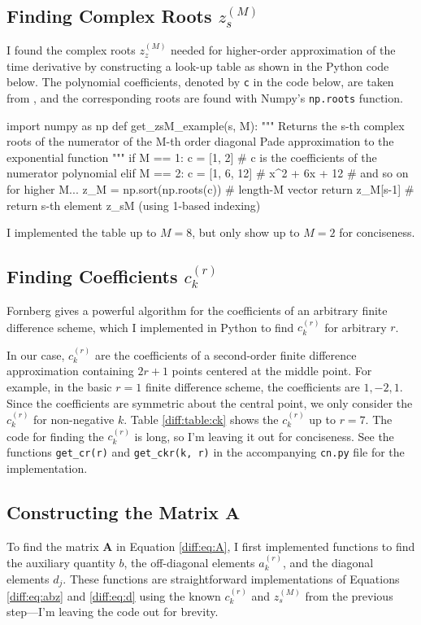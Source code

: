 \documentclass[11pt, a4paper]{article}
\newcommand{\mat}[1]{\mathbf{#1}}
\begin{document}
\subsection{Finding Complex Roots $ z_{s}^{(M)} $}
I found the complex roots $ z_{z}^{(M)} $ needed for higher-order approximation of the time derivative by constructing a look-up table as shown in the Python code below. The polynomial coefficients, denoted by \texttt{c} in the code below, are taken from \cite{oes-exp}, and the corresponding roots are found with Numpy's \texttt{np.roots} function.
\begin{python}
import numpy as np
def get_zsM_example(s, M):
    """ Returns the s-th complex roots of the numerator of the M-th order 
         diagonal Pade approximation to the exponential function """
    if M == 1:
        c = [1, 2]  # c is the coefficients of the numerator polynomial
    elif M == 2:
        c = [1, 6, 12]  # x^2 + 6x + 12
    # and so on for higher M...
    z_M = np.sort(np.roots(c))  # length-M vector
    return z_M[s-1]  # return s-th element z_sM (using 1-based indexing) 
\end{python}
I implemented the table up to $ M = 8 $, but only show up to $ M = 2 $  for conciseness.

\subsection{Finding Coefficients $ c_{k}^{(r)} $}
Fornberg \cite{fornberg} gives a powerful algorithm for the coefficients of an arbitrary finite difference scheme, which I implemented in Python to find $ c_{k}^{(r)} $ for arbitrary $ r $.

In our case, $ c_{k}^{(r)} $ are the coefficients of a second-order finite difference approximation containing $ 2r + 1 $ points centered at the middle point. For example, in the basic $ r = 1 $ finite difference scheme, the coefficients are $ 1, -2, 1 $. Since the coefficients are symmetric about the central point, we only consider the $ c_{k}^{(r)} $ for non-negative $ k $. Table \ref{diff:table:ck} shows the $ c_{k}^{(r)} $ up to $ r = 7 $. The code for finding the $ c_{k}^{(r)} $ is long, so I'm leaving it out for conciseness. See the functions \texttt{get\_cr(r)} and \texttt{get\_ckr(k, r)} in the accompanying \texttt{cn.py} file for the implementation.

\subsection{Constructing the Matrix $ \mat{A} $}
To find the matrix $ \mat{A} $ in Equation \ref{diff:eq:A}, I first implemented functions to find the auxiliary quantity $ b $, the off-diagonal elements $ a_{k}^{(r)} $, and the diagonal elements $ d_{j} $. These functions are straightforward implementations of Equations \ref{diff:eq:abz} and \ref{diff:eq:d} using the known $ c_{k}^{(r)} $ and $ z_{s}^{(M)} $ from the previous step---I'm leaving the code out for brevity. 
\end{document}

